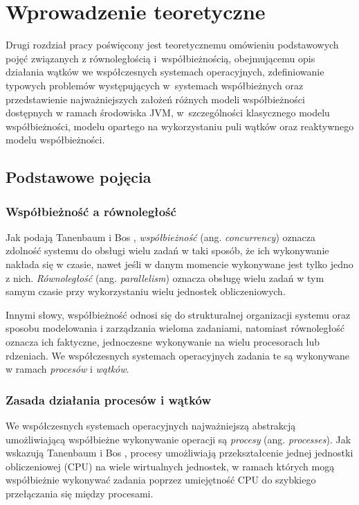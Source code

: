 \chapter{Wprowadzenie teoretyczne}

Drugi rozdział pracy poświęcony jest teoretycznemu omówieniu podstawowych pojęć związanych z równoległością i~współbieżnością, obejmującemu opis działania wątków we współczesnych systemach operacyjnych, zdefiniowanie typowych problemów występujących w~systemach współbieżnych oraz przedstawienie najważniejszych założeń różnych modeli współbieżności dostępnych w ramach środowiska JVM, w~szczególności klasycznego modelu współbieżności, modelu opartego na wykorzystaniu puli wątków oraz reaktywnego modelu współbieżności.

\section{Podstawowe pojęcia}

\subsection{Współbieżność a równoległość}

Jak podają Tanenbaum i Bos \cite{tanenbaum2023}, \emph{współbieżność} (ang. \emph{concurrency}) oznacza zdolność systemu do obsługi wielu zadań w taki sposób, że ich wykonywanie nakłada się w czasie, nawet jeśli w danym momencie wykonywane jest tylko jedno z nich. \emph{Równoległość} (ang. \emph{parallelism}) oznacza obsługę wielu zadań w tym samym czasie przy wykorzystaniu wielu jednostek obliczeniowych.

Innymi słowy, współbieżność odnosi się do strukturalnej organizacji systemu oraz sposobu modelowania i zarządzania wieloma zadaniami, natomiast równoległość oznacza ich faktyczne, jednoczesne wykonywanie na wielu procesorach lub rdzeniach. We współczesnych systemach operacyjnych zadania te są wykonywane w ramach \emph{procesów} i \emph{wątków}.


\newpage
\subsection{Zasada działania procesów i wątków}

We współczesnych systemach operacyjnych najważniejszą abstrakcją umożliwiającą współbieżne wykonywanie operacji są \emph{procesy} (ang. \emph{processes}). Jak wskazują Tanenbaum i Bos \cite{tanenbaum2023}, procesy umożliwiają przekształcenie jednej jednostki obliczeniowej (CPU) na wiele wirtualnych jednostek, w ramach których mogą współbieżnie wykonywać zadania poprzez umiejętność CPU do szybkiego przełączania się między procesami.

